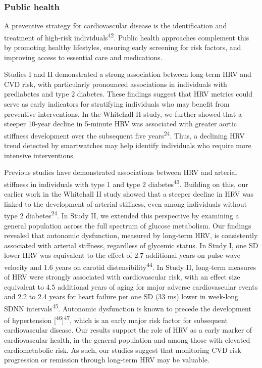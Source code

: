 \documentclass[
  a4paper,
  headsepline=true,
  open=any]{scrbook}
\begin{document}
\hypertarget{public-health}{%
\subsubsection{Public health}\label{public-health}}

A preventive strategy for cardiovascular disease is the identification
and treatment of high-risk individuals\textsuperscript{42}. Public
health approaches complement this by promoting healthy lifestyles,
ensuring early screening for risk factors, and improving access to
essential care and medications.

Studies I and II demonstrated a strong association between long-term HRV
and CVD risk, with particularly pronounced associations in individuals
with prediabetes and type 2 diabetes. These findings suggest that HRV
metrics could serve as early indicators for stratifying individuals who
may benefit from preventive interventions. In the Whitehall II study, we
further showed that a steeper 10-year decline in 5-minute HRV was
associated with greater aortic stiffness development over the subsequent
five years\textsuperscript{24}. Thus, a declining HRV trend detected by
smartwatches may help identify individuals who require more intensive
interventions.

Previous studies have demonstrated associations between HRV and arterial
stiffness in individuals with type 1 and type 2
diabetes\textsuperscript{43}. Building on this, our earlier work in the
Whitehall II study showed that a steeper decline in HRV was linked to
the development of arterial stiffness, even among individuals without
type 2 diabetes\textsuperscript{24}. In Study II, we extended this
perspective by examining a general population across the full spectrum
of glucose metabolism. Our findings revealed that autonomic dysfunction,
measured by long-term HRV, is consistently associated with arterial
stiffness, regardless of glycemic status. In Study I, one SD lower HRV
was equivalent to the effect of 2.7 additional years on pulse wave
velocity and 1.6 years on carotid distensibility\textsuperscript{44}. In
Study II, long-term measures of HRV were strongly associated with
cardiovascular risk, with an effect size equivalent to 4.5 additional
years of aging for major adverse cardiovascular events and 2.2 to 2.4
years for heart failure per one SD (33 ms) lower in week-long SDNN
intervals\textsuperscript{45}. Autonomic dysfunction is known to precede
the development of hypertension
{[}\textsuperscript{46}{]}\textsuperscript{47}, which is an early major
risk factor for subsequent cardiovascular disease. Our results support
the role of HRV as a early marker of cardiovascular health, in the
general population and among those with elevated cardiometabolic risk.
As such, our studies suggest that monitoring CVD risk progression or
remission through long-term HRV may be valuable.
\end{document}
